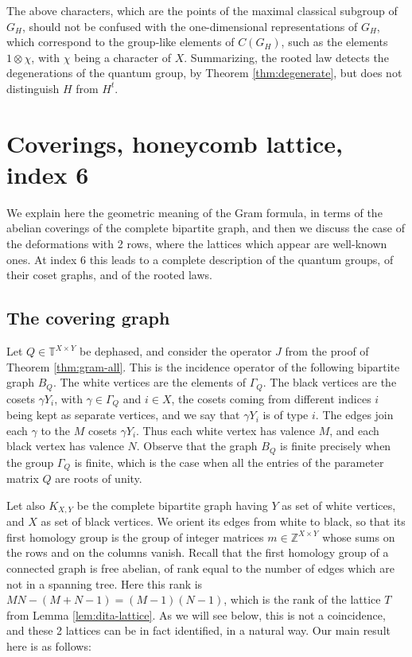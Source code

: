 \documentclass[11pt,reqno]{amsart}
\theoremstyle{definition}
\numberwithin{equation}{section}
\begin{document}
The above characters, which are the points of the maximal classical subgroup of $G_H$, should not be confused with the one-dimensional representations of $G_H$, which correspond to the group-like elements of $C(G_H)$, such as the elements $1\otimes\chi$, with $\chi$ being a character of $X$. Summarizing, the rooted law detects the degenerations of the quantum group, by Theorem \ref{thm:degenerate}, but does not distinguish $H$ from $H^t$.

\section{Coverings, honeycomb lattice, index 6}\label{sec:lattices}

We explain here the geometric meaning of the Gram formula, in terms of the abelian coverings of the complete bipartite graph, and then we discuss the case of the deformations with 2 rows, where the lattices which appear are well-known ones. At index 6 this leads to a complete description of the quantum groups, of their coset graphs, and of the rooted laws.

\subsection{The covering graph}

Let $Q\in\mathbb T^{X\times Y}$ be dephased, and consider the operator $J$ from the proof of Theorem \ref{thm:gram-all}. This is the incidence operator of the following bipartite graph $B_Q$. The white vertices are the elements of $\Gamma_Q$. The black vertices are the cosets $\gamma Y_i$, with $\gamma\in\Gamma_Q$ and $i\in X$, the cosets coming from different indices $i$ being kept as separate vertices, and we say that $\gamma Y_i$ is of type $i$. The edges join each $\gamma$ to the $M$ cosets $\gamma Y_i$. Thus each white vertex has valence $M$, and each black vertex has valence $N$. Observe that the graph $B_Q$ is finite precisely when the group $\Gamma_Q$ is finite, which is the case when all the entries of the parameter matrix $Q$ are roots of unity.

Let also $K_{X,Y}$ be the complete bipartite graph having $Y$ as set of white vertices, and $X$ as set of black vertices. We orient its edges from white to black, so that its first homology group is the group of integer matrices $m\in\mathbb Z^{X\times Y}$ whose sums on the rows and on the columns vanish. Recall that the first homology group of a connected graph is free abelian, of rank equal to the number of edges which are not in a spanning tree. Here this rank is $MN-(M+N-1)=(M-1)(N-1)$, which is the rank of the lattice $T$ from Lemma \ref{lem:dita-lattice}. As we will see below, this is not a coincidence, and these 2 lattices can be in fact identified, in a natural way. Our main result here is as follows:
\end{document}
